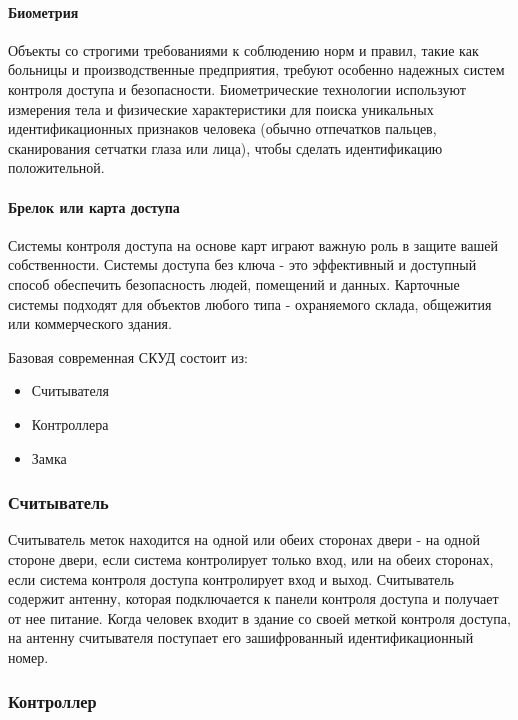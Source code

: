\paragraph{Биометрия}

Объекты со строгими требованиями к соблюдению норм и правил, такие как больницы и производственные предприятия, требуют особенно надежных систем контроля доступа и безопасности. Биометрические технологии используют измерения тела и физические характеристики для поиска уникальных идентификационных признаков человека (обычно отпечатков пальцев, сканирования сетчатки глаза или лица), чтобы сделать идентификацию положительной. 

\paragraph{Брелок или карта доступа}

Системы контроля доступа на основе карт играют важную роль в защите вашей собственности. Системы доступа без ключа - это эффективный и доступный способ обеспечить безопасность людей, помещений и данных. Карточные системы подходят для объектов любого типа - охраняемого склада, общежития или коммерческого здания.

Базовая современная СКУД состоит из:

\begin{itemize}
	\item Считывателя
	\item Контроллера
	\item Замка
\end{itemize}

\subsubsection {Считыватель}

Считыватель меток находится на одной или обеих сторонах двери - на одной стороне двери, если система контролирует только вход, или на обеих сторонах, если система контроля доступа контролирует вход и выход. Считыватель содержит антенну, которая подключается к панели контроля доступа и получает от нее питание.
Когда человек входит в здание со своей меткой контроля доступа, на антенну считывателя поступает его зашифрованный идентификационный номер.

\subsubsection {Контроллер}

